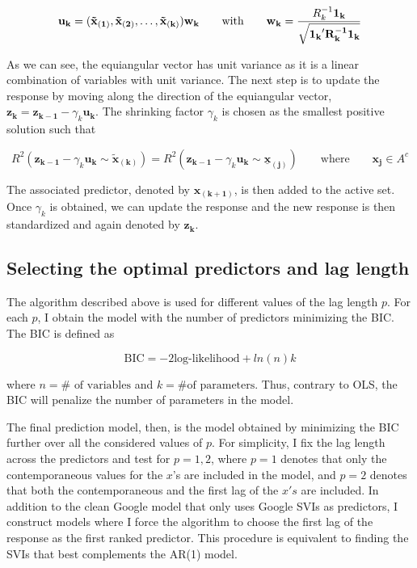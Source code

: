 \begin{equation}\label{equiangular_vector}
\mathbf{u_k} = (\mathbf{\tilde{x}_{(1)}, \tilde{x}_{(2)}, \ldots, \tilde{x}_{(k)})w_k} \quad \quad \text{with} \quad \quad \mathbf{w_k} = \frac{R_k^{-1} \bf{1_k}}{\sqrt{\bf{1_k}' R_k^{-1} \bf{1_k}}}
\end{equation}

As we can see, the equiangular vector has unit variance as it is a linear combination of variables with unit variance. The next step is to update the response by moving along the direction of the equiangular vector, $\mathbf{z_k = z_{k-1}} - \gamma_k \mathbf{u_k}$. The shrinking factor $\gamma_k$ is chosen as the smallest positive solution such that

\begin{equation}\label{rsq}
R^2(\mathbf{z_{k-1}} - \gamma_k \mathbf{u_k} \sim \mathbf{\tilde{x}_{(k)}}) = R^2(\mathbf{z_{k-1}} - \gamma_k \mathbf{u_k} \sim \mathbf{\underline{x}_{(j)}}) \quad \quad \text{where} \quad \quad \mathbf{x_j} \in A^c
\end{equation}

The associated predictor, denoted by $\mathbf{x_{(k+1)}}$, is then added to the active set. Once $\gamma_k$ is obtained, we can update the response and the new response is then standardized and again denoted by $\mathbf{z_k}$.



\subsection{Selecting the optimal predictors and lag length}


The algorithm described above is used for different values of the lag length $p$. For each $p$, I obtain the model with the number of predictors minimizing the BIC. The BIC is defined as

\begin{equation}\label{bic}
\text{BIC} = -2 \text{log-likelihood} + ln(n) k
\end{equation}

\noindent where $n =\# \text{ of variables}$ and $k = \text{\# of parameters}$. Thus, contrary to OLS, the BIC will penalize the number of parameters in the model.

The final prediction model, then, is the model obtained by minimizing the BIC further over all the considered values of $p$. For simplicity, I fix the lag length across the predictors and test for $p = 1, 2$, where $p = 1$ denotes that only the contemporaneous values for the $x$'s are included in the model, and $p = 2$ denotes that both the contemporaneous and the first lag of the $x's$ are included. In addition to the clean Google model that only uses Google SVIs as predictors, I construct models where I force the algorithm to choose the first lag of the response as the first ranked predictor. This procedure is equivalent to finding the SVIs that best complements the AR(1) model.

